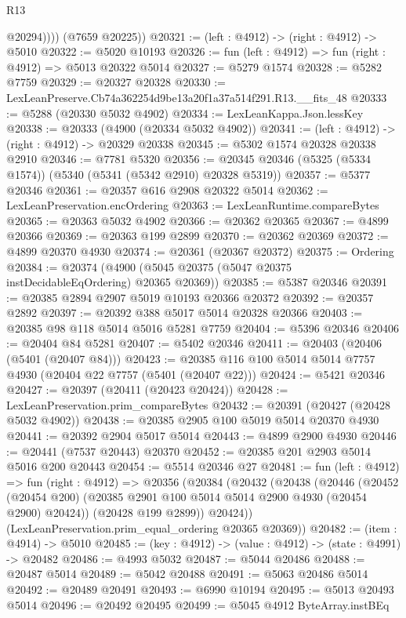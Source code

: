 \begin{lexlean}{R13}
\begin{coremodule}
              @20294))))
      (@7659 @20225))
@20321 := (left : @4912) -> (right : @4912) -> @5010
@20322 := @5020 @10193
@20326 := fun (left : @4912) => fun (right : @4912) => @5013 @20322 @5014
@20327 := @5279 @1574
@20328 := @5282 @7759
@20329 := @20327 @20328
@20330 := LexLeanPreserve.Cb74a362254d9be13a20f1a37a514f291.R13.__fits_48
@20333 := @5288 (@20330 @5032 @4902)
@20334 := LexLeanKappa.Json.lessKey
@20338 := @20333 (@4900 (@20334 @5032 @4902))
@20341 := (left : @4912) -> (right : @4912) -> @20329 @20338
@20345 := @5302 @1574 @20328 @20338 @2910
@20346 := @7781 @5320
@20356 := @20345 @20346 (@5325 (@5334 @1574)) (@5340 (@5341 (@5342 @2910) @20328 @5319))
@20357 := @5377 @20346
@20361 := @20357 @616 @2908 @20322 @5014
@20362 := LexLeanPreservation.encOrdering
@20363 := LexLeanRuntime.compareBytes
@20365 := @20363 @5032 @4902
@20366 := @20362 @20365
@20367 := @4899 @20366
@20369 := @20363 @199 @2899
@20370 := @20362 @20369
@20372 := @4899 @20370 @4930
@20374 := @20361 (@20367 @20372)
@20375 := Ordering
@20384 := @20374 (@4900 (@5045 @20375 (@5047 @20375 instDecidableEqOrdering) @20365 @20369))
@20385 := @5387 @20346
@20391 := @20385 @2894 @2907 @5019 @10193 @20366 @20372
@20392 := @20357 @2892
@20397 := @20392 @388 @5017 @5014 @20328 @20366
@20403 := @20385 @98 @118 @5014 @5016 @5281 @7759
@20404 := @5396 @20346
@20406 := @20404 @84 @5281
@20407 := @5402 @20346
@20411 := @20403 (@20406 (@5401 (@20407 @84)))
@20423 := @20385 @116 @100 @5014 @5014 @7757 @4930 (@20404 @22 @7757 (@5401 (@20407 @22)))
@20424 := @5421 @20346
@20427 := @20397 (@20411 (@20423 @20424))
@20428 := LexLeanPreservation.prim_compareBytes
@20432 := @20391 (@20427 (@20428 @5032 @4902))
@20438 := @20385 @2905 @100 @5019 @5014 @20370 @4930
@20441 := @20392 @2904 @5017 @5014
@20443 := @4899 @2900 @4930
@20446 := @20441 (@7537 @20443) @20370
@20452 := @20385 @201 @2903 @5014 @5016 @200 @20443
@20454 := @5514 @20346 @27
@20481 := fun (left : @4912) =>
  fun (right : @4912) =>
  @20356
    (@20384
      (@20432
        (@20438
          (@20446
            (@20452 (@20454 @200) (@20385 @2901 @100 @5014 @5014 @2900 @4930 (@20454 @2900) @20424))
            (@20428 @199 @2899))
          @20424))
      (LexLeanPreservation.prim_equal_ordering @20365 @20369))
@20482 := (item : @4914) -> @5010
@20485 := (key : @4912) -> (value : @4912) -> (state : @4991) -> @20482
@20486 := @4993 @5032
@20487 := @5044 @20486
@20488 := @20487 @5014
@20489 := @5042 @20488
@20491 := @5063 @20486 @5014
@20492 := @20489 @20491
@20493 := @6990 @10194
@20495 := @5013 @20493 @5014
@20496 := @20492 @20495
@20499 := @5045 @4912 ByteArray.instBEq

\end{coremodule}
\end{lexlean}
